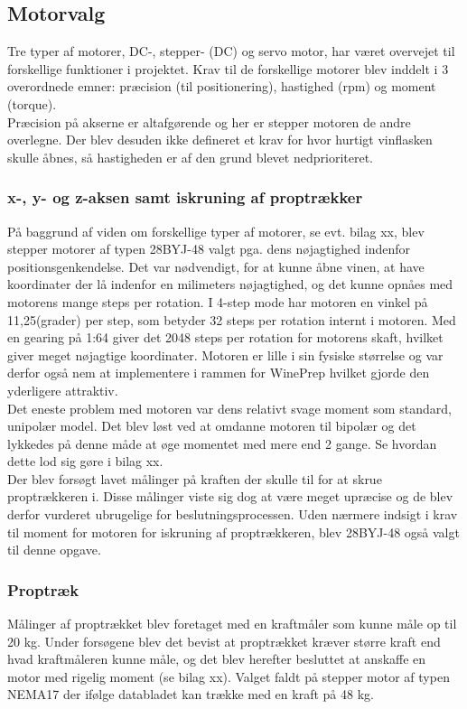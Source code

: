 \subsection{Motorvalg}
Tre typer af motorer, DC-, stepper- (DC) og servo motor, har været overvejet til forskellige funktioner i projektet. Krav til de forskellige motorer blev inddelt i 3 overordnede emner: præcision (til positionering), hastighed (rpm) og moment (torque).\\

Præcision på akserne er altafgørende og her er stepper motoren de andre overlegne. Der blev desuden ikke defineret et krav for hvor hurtigt vinflasken skulle åbnes, så hastigheden er af den grund blevet nedprioriteret.

\subsubsection{x-, y- og z-aksen samt iskruning af proptrækker}
På baggrund af viden om forskellige typer af motorer, se evt. bilag xx, blev stepper motorer af typen 28BYJ-48 valgt pga. dens nøjagtighed indenfor positionsgenkendelse. Det var nødvendigt, for at kunne åbne vinen, at have koordinater der lå indenfor en milimeters nøjagtighed, og det kunne opnåes med motorens mange steps per rotation. I 4-step mode har motoren en vinkel på 11,25(grader) per step, som betyder 32 steps per rotation internt i motoren. Med en gearing på 1:64 giver det 2048 steps per rotation for motorens skaft, hvilket giver meget nøjagtige koordinater. Motoren er lille i sin fysiske størrelse og var derfor også nem at implementere i rammen for WinePrep hvilket gjorde den yderligere attraktiv.\\

Det eneste problem med motoren var dens relativt svage moment som standard, unipolær model. Det blev løst ved at omdanne motoren til bipolær og det lykkedes på denne måde at øge momentet med mere end 2 gange. Se hvordan dette lod sig gøre i bilag xx.\\

Der blev forsøgt lavet målinger på kraften der skulle til for at skrue proptrækkeren i. Disse målinger viste sig dog at være meget upræcise og de blev derfor vurderet ubrugelige for beslutningsprocessen. Uden nærmere indsigt i krav til moment for motoren for iskruning af proptrækkeren, blev 28BYJ-48 også valgt til denne opgave.

\subsubsection{Proptræk}
Målinger af proptrækket blev foretaget med en kraftmåler som kunne måle op til 20 kg. Under forsøgene blev det bevist at proptrækket kræver større kraft end hvad kraftmåleren kunne måle, og det blev herefter besluttet at anskaffe en motor med rigelig moment (se bilag xx). Valget faldt på stepper motor af typen NEMA17 der ifølge databladet kan trække med en kraft på 48 kg. 

